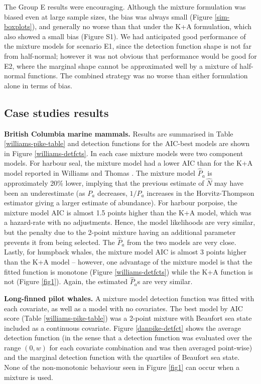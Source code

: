 \documentclass[10pt]{article}
\begin{document}
The Group E results were encouraging.  Although the mixture formulation was biased even at large sample sizes, the bias was always small (Figure \ref{sim-boxplots}), and generally no worse than that under the K+A formulation, which also showed a small bias (Figure S1). We had anticipated good performance of the mixture models for scenario E1, since the detection function shape is not far from half-normal; however it was not obvious that performance would be good for E2, where the marginal shape cannot be approximated well by a mixture of half-normal functions.  The combined strategy was no worse than either formulation alone in terms of bias.  


\subsection*{Case studies results}

\textbf{British Columbia marine mammals.} Results are summarised in Table \ref{williams-pike-table} and detection functions for the AIC-best models are shown in Figure \ref{williams-detfcts}. In each case mixture models were two component models. For harbour seal, the mixture model had a lower AIC than for the K+A model reported in Williams and Thomas \cite{Williams:2007tc}. The mixture model $\hat{P}_a$ is approximately 20\% lower, implying that the previous estimate of $\hat{N}$ may have been an underestimate (as $P_a$ decreases, $1/P_a$ increases in the Horvitz-Thompson estimator giving a larger estimate of abundance). For harbour porpoise, the mixture model AIC is almost 1.5 points higher than the K+A model, which was a hazard-rate with no adjustments. Hence, the model likelihoods are very similar, but the penalty due to the 2-point mixture having an additional parameter prevents it from being selected.  The $\hat{P}_a$ from the two models are very close. Lastly, for humpback whales, the mixture model AIC is almost 3 points higher than the K+A model -- however, one advantage of the mixture model is that the fitted function is monotone (Figure \ref{williams-detfcts}) while the K+A function is not (Figure \ref{fig1}). Again, the estimated $\hat{P}_a$s are very similar.

\textbf{Long-finned pilot whales.} A mixture model detection function was fitted with each covariate, as well as a model with no covariates. The best model by AIC score (Table \ref{williams-pike-table}) was a 2-point mixture with Beaufort sea state included as a continuous covariate. Figure \ref{danpike-detfct} shows the average detection function (in the sense that a detection function was evaluated over the range $(0,w)$ for each covariate combination and was then averaged point-wise) and the marginal detection function with the quartiles of Beaufort sea state. None of the non-monotonic behaviour seen in Figure \ref{fig1} can occur when a mixture is used.
\end{document}
